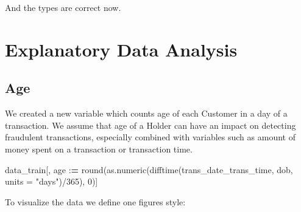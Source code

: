 \documentclass[
]{report}
\newenvironment{Shaded}{\begin{snugshade}}{\end{snugshade}}
\newcommand{\AttributeTok}[1]{\textcolor[rgb]{0.77,0.63,0.00}{#1}}
\newcommand{\DecValTok}[1]{\textcolor[rgb]{0.00,0.00,0.81}{#1}}
\newcommand{\ErrorTok}[1]{\textcolor[rgb]{0.64,0.00,0.00}{\textbf{#1}}}
\newcommand{\FunctionTok}[1]{\textcolor[rgb]{0.00,0.00,0.00}{#1}}
\newcommand{\NormalTok}[1]{#1}
\newcommand{\SpecialCharTok}[1]{\textcolor[rgb]{0.00,0.00,0.00}{#1}}
\newcommand{\StringTok}[1]{\textcolor[rgb]{0.31,0.60,0.02}{#1}}
\begin{document}
And the types are correct now.

\hypertarget{explanatory-data-analysis}{%
\section{Explanatory Data Analysis}\label{explanatory-data-analysis}}

\hypertarget{age}{%
\subsection{Age}\label{age}}

We created a new variable which counts age of each Customer in a day of
a transaction. We assume that age of a Holder can have an impact on
detecting fraudulent transactions, especially combined with variables
such as amount of money spent on a transaction or transaction time.

\begin{Shaded}
\begin{Highlighting}[]
\NormalTok{data\_train[, age }\SpecialCharTok{:}\ErrorTok{=} \FunctionTok{round}\NormalTok{(}\FunctionTok{as.numeric}\NormalTok{(}\FunctionTok{difftime}\NormalTok{(trans\_date\_trans\_time, dob, }\AttributeTok{units =} \StringTok{"days"}\NormalTok{)}\SpecialCharTok{/}\DecValTok{365}\NormalTok{), }\DecValTok{0}\NormalTok{)]}
\end{Highlighting}
\end{Shaded}

To visualize the data we define one figures style:
\end{document}
